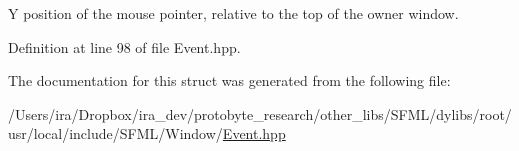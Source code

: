 Y position of the mouse pointer, relative to the top of the owner window. 



Definition at line 98 of file Event.\-hpp.



The documentation for this struct was generated from the following file\-:\begin{DoxyCompactItemize}
\item 
/\-Users/ira/\-Dropbox/ira\-\_\-dev/protobyte\-\_\-research/other\-\_\-libs/\-S\-F\-M\-L/dylibs/root/usr/local/include/\-S\-F\-M\-L/\-Window/\hyperlink{_event_8hpp}{Event.\-hpp}\end{DoxyCompactItemize}
